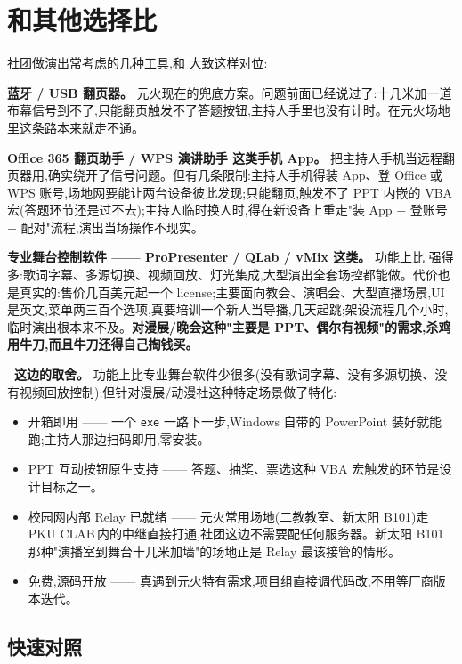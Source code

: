 \section{和其他选择比}

社团做演出常考虑的几种工具,和\,\app\,大致这样对位:

\textbf{蓝牙 / USB 翻页器。} 元火现在的兜底方案。问题前面已经说过了:十几米加一道布幕信号到不了,只能翻页触发不了答题按钮,主持人手里也没有计时。在元火场地里这条路本来就走不通。

\textbf{Office 365 翻页助手 / WPS 演讲助手 这类手机 App。} 把主持人手机当远程翻页器用,确实绕开了信号问题。但有几条限制:主持人手机得装 App、登 Office 或 WPS 账号,场地网要能让两台设备彼此发现;只能翻页,触发不了 PPT 内嵌的 VBA 宏(答题环节还是过不去);主持人临时换人时,得在新设备上重走"装 App + 登账号 + 配对"流程,演出当场操作不现实。

\textbf{专业舞台控制软件 —— ProPresenter / QLab / vMix 这类。} 功能上比\,\app\,强得多:歌词字幕、多源切换、视频回放、灯光集成,大型演出全套场控都能做。代价也是真实的:售价几百美元起一个 license;主要面向教会、演唱会、大型直播场景,UI 是英文,菜单两三百个选项,真要培训一个新人当导播,几天起跳;架设流程几个小时,临时演出根本来不及。\textbf{对漫展/晚会这种"主要是 PPT、偶尔有视频"的需求,杀鸡用牛刀,而且牛刀还得自己掏钱买。}

\textbf{\app\ 这边的取舍。} 功能上比专业舞台软件少很多(没有歌词字幕、没有多源切换、没有视频回放控制);但针对漫展/动漫社这种特定场景做了特化:

\begin{itemize}
  \item 开箱即用 —— 一个 \texttt{exe} 一路下一步,Windows 自带的 PowerPoint 装好就能跑;主持人那边扫码即用,零安装。
  \item PPT 互动按钮原生支持 —— 答题、抽奖、票选这种 VBA 宏触发的环节是设计目标之一。
  \item 校园网内部 Relay 已就绪 —— 元火常用场地(二教教室、新太阳 B101)走\,PKU CLAB\,内的中继直接打通,社团这边不需要配任何服务器。新太阳 B101 那种"演播室到舞台十几米加墙"的场地正是 Relay 最该接管的情形。
  \item 免费,源码开放 —— 真遇到元火特有需求,项目组直接调代码改,不用等厂商版本迭代。
\end{itemize}

\subsection{快速对照}


